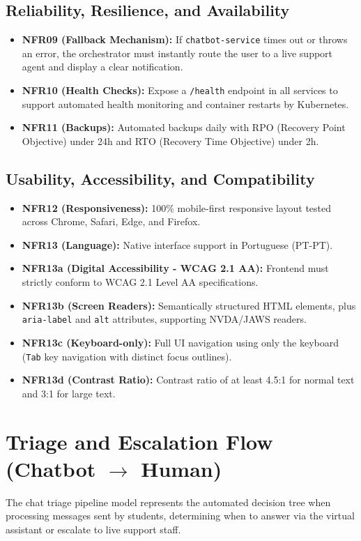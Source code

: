 \subsection{Reliability, Resilience, and Availability}
\begin{itemize}
    \item \textbf{NFR09 (Fallback Mechanism):} If \texttt{chatbot-service} times out or throws an error, the orchestrator must instantly route the user to a live support agent and display a clear notification.
    \item \textbf{NFR10 (Health Checks):} Expose a \texttt{/health} endpoint in all services to support automated health monitoring and container restarts by Kubernetes.
    \item \textbf{NFR11 (Backups):} Automated backups daily with \ac{RPO} (Recovery Point Objective) under 24h and \ac{RTO} (Recovery Time Objective) under 2h.
\end{itemize}

\subsection{Usability, Accessibility, and Compatibility}
\begin{itemize}
    \item \textbf{NFR12 (Responsiveness):} 100\% mobile-first responsive layout tested across Chrome, Safari, Edge, and Firefox.
    \item \textbf{NFR13 (Language):} Native interface support in Portuguese (PT-PT).
    \item \textbf{NFR13a (Digital Accessibility - \ac{WCAG} 2.1 AA):} Frontend must strictly conform to \ac{WCAG} 2.1 Level AA specifications.
    \item \textbf{NFR13b (Screen Readers):} Semantically structured \ac{HTML} elements, plus \texttt{aria-label} and \texttt{alt} attributes, supporting NVDA/JAWS readers.
    \item \textbf{NFR13c (Keyboard-only):} Full \ac{UI} navigation using only the keyboard (\texttt{Tab} key navigation with distinct focus outlines).
    \item \textbf{NFR13d (Contrast Ratio):} Contrast ratio of at least 4.5:1 for normal text and 3:1 for large text.
\end{itemize}

\newpage

\section{Triage and Escalation Flow (Chatbot $\rightarrow$ Human)}
The chat triage pipeline model represents the automated decision tree when processing messages sent by students, determining when to answer via the virtual assistant or escalate to live support staff.


